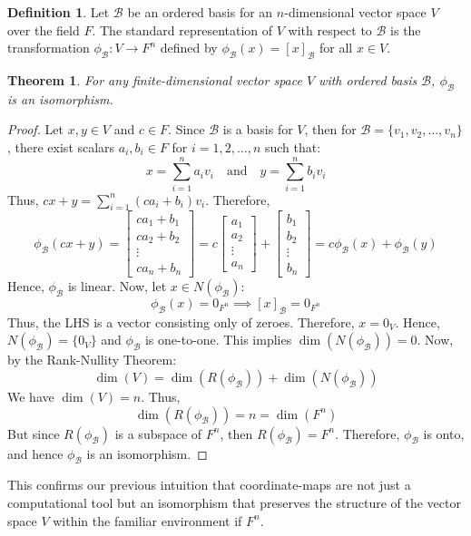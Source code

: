 \documentclass[12pt, a4paper]{article}
\newtheorem{theorem}{Theorem}[section]
\theoremstyle{definition}
\newtheorem{definition}{Definition}[section]
\theoremstyle{remark}
\newcommand{\B}{\mathscr{B}}
\begin{document}
\begin{definition}
    Let $\B$ be an ordered basis for an $n$-dimensional vector space $V$ over the field $F$. The standard representation of $V$ with respect to $\B$ is the transformation $\phi_\B:V \to F^n$ defined by $\phi_\B(x) = [x]_\B$ for all $x \in V$.
\end{definition}

\begin{theorem}
    For any finite-dimensional vector space $V$ with ordered basis $\B$, $\phi_\B$ is an isomorphism.
\end{theorem}

\begin{proof}
    Let $x, y \in V$ and $c \in F$. Since $\B$ is a basis for $V$, then for $\B = \{v_1, v_2, \dots, v_n\}$, there exist scalars $a_i, b_i \in F$ for $i = 1, 2, \dots, n$ such that:
\[ x = \sum_{i=1}^{n} a_i v_i \quad \text{and} \quad y = \sum_{i=1}^{n} b_i v_i \]
Thus, $cx + y = \displaystyle\sum_{i=1}^{n} (ca_i + b_i) v_i$. Therefore,
\[ \phi_\B(cx + y) = \begin{bmatrix} ca_1 + b_1 \\ ca_2 + b_2 \\ \vdots \\ ca_n + b_n \end{bmatrix} = c \begin{bmatrix} a_1 \\ a_2 \\ \vdots \\ a_n \end{bmatrix} + \begin{bmatrix} b_1 \\ b_2 \\ \vdots \\ b_n \end{bmatrix} = c \phi_\B(x) + \phi_\B(y) \]
Hence, $\phi_\B$ is linear. Now, let $x \in N(\phi_\B)$:
\[ \phi_\B(x) = 0_{F^n} \implies [x]_\B = 0_{F^n} \]
Thus, the LHS is a vector consisting only of zeroes. Therefore, $x = 0_V$. Hence, $N(\phi_\B) = \{0_V\}$ and $\phi_\B$ is one-to-one. This implies $\dim(N(\phi_\B)) = 0$. Now, by the Rank-Nullity Theorem:
\[ \dim(V) = \dim(R(\phi_\B)) + \dim(N(\phi_\B)) \]
We have $\dim(V) = n$. Thus,
\[ \dim(R(\phi_\B)) = n = \dim(F^n) \]
But since $R(\phi_\B)$ is a subspace of $F^n$, then $R(\phi_\B) = F^n$. Therefore, $\phi_\B$ is onto, and hence $\phi_\B$ is an isomorphism.
\end{proof}

This confirms our previous intuition that coordinate-maps are not just a computational tool but an isomorphism that preserves the structure of the vector space $V$ within the familiar environment if $F^n$.
\end{document}
